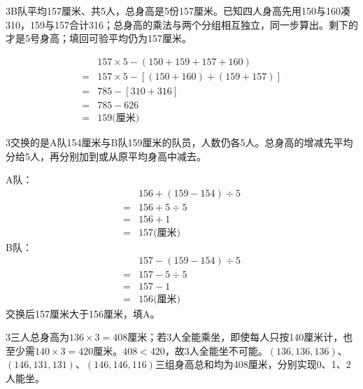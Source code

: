 \documentclass[multi=snippet,border={5bp 20bp 5bp 5bp}]{standalone}
\newenvironment{snippet}[3]{\begin{minipage}{#1bp}\color{answerred}\fontsize{#2}{#3}\selectfont\raggedright}{\end{minipage}}
\begin{document}
\begin{snippet}{505}{11.5}{14}\begin{multicols}{3}\raggedcolumns B队平均157厘米、共5人，总身高是5份157厘米。已知四人身高先用150与160凑310，159与157合计316；总身高的乘法与两个分组相互独立，同一步算出。剩下的才是5号身高；填回可验平均仍为157厘米。\end{multicols}\[\begin{aligned}&157\times5-(150+159+157+160)\\={}&157\times5-[(150+160)+(159+157)]\\={}&785-[310+316]\\={}&785-626\\={}&159\text{(厘米)}\end{aligned}\]\end{snippet}
\begin{snippet}{505}{11.5}{14}\begin{multicols}{3}\raggedcolumns 交换的是A队154厘米与B队159厘米的队员，人数仍各5人。总身高的增减先平均分给5人，再分别加到或从原平均身高中减去。\par A队：\[\begin{aligned}&156+(159-154)\div5\\={}&156+5\div5\\={}&156+1\\={}&157\text{(厘米)}\end{aligned}\]B队：\[\begin{aligned}&157-(159-154)\div5\\={}&157-5\div5\\={}&157-1\\={}&156\text{(厘米)}\end{aligned}\]交换后157厘米大于156厘米，填A。\end{multicols}\end{snippet}
\begin{snippet}{505}{11.5}{14}\begin{multicols}{3}\raggedcolumns 三人总身高为\(136\times3=408\)\allowbreak 厘米；若3人全能乘坐，即使每人只按140厘米计，也至少需\(140\times3=420\)\allowbreak 厘米。\(408<420\)\allowbreak ，故3人全能坐不可能。\((136,\allowbreak 136,\allowbreak 136)\)\allowbreak 、\((146,\allowbreak 131,\allowbreak 131)\)\allowbreak 、\((146,\allowbreak 146,\allowbreak 116)\)\allowbreak 三组身高总和均为408厘米，分别实现0、1、2人能坐。\end{multicols}\end{snippet}
\end{document}
